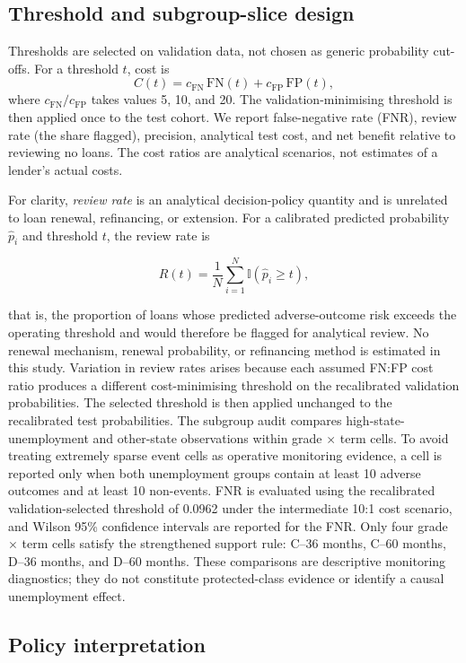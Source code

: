\documentclass[10pt]{article}
\begin{document}
\subsection{Threshold and subgroup-slice design}

Thresholds are selected on validation data, not chosen as generic probability cut-offs. For a threshold $t$, cost is
\[
  C(t)=c_{\mathrm{FN}}\,\mathrm{FN}(t)+c_{\mathrm{FP}}\,\mathrm{FP}(t),
\]
where $c_{\mathrm{FN}}/c_{\mathrm{FP}}$ takes values 5, 10, and 20. The validation-minimising threshold is then applied once to the test cohort. We report false-negative rate (FNR), review rate (the share flagged), precision, analytical test cost, and net benefit relative to reviewing no loans. The cost ratios are analytical scenarios, not estimates of a lender's actual costs.

For clarity, \emph{review rate} is an analytical decision-policy quantity and is unrelated to loan renewal, refinancing, or extension. For a calibrated predicted probability $\hat p_i$ and threshold $t$, the review rate is

\[
R(t)=\frac{1}{N}\sum_{i=1}^{N}\mathbb{I}(\hat p_i \geq t),
\]

that is, the proportion of loans whose predicted adverse-outcome risk exceeds the operating threshold and would therefore be flagged for analytical review. No renewal mechanism, renewal probability, or refinancing method is estimated in this study. Variation in review rates arises because each assumed FN:FP cost ratio produces a different cost-minimising threshold on the recalibrated validation probabilities. The selected threshold is then applied unchanged to the recalibrated test probabilities. The subgroup audit compares high-state-unemployment and other-state observations within grade $\times$ term cells. To avoid treating extremely sparse event cells as operative monitoring evidence, a cell is reported only when both unemployment groups contain at least 10 adverse outcomes and at least 10 non-events. FNR is evaluated using the recalibrated validation-selected threshold of 0.0962 under the intermediate 10:1 cost scenario, and Wilson 95\% confidence intervals are reported for the FNR. Only four grade $\times$ term cells satisfy the strengthened support rule: C--36 months, C--60 months, D--36 months, and D--60 months. These comparisons are descriptive monitoring diagnostics; they do not constitute protected-class evidence or identify a causal unemployment effect.

\subsection{Policy interpretation}
\end{document}
